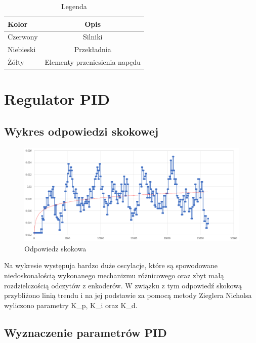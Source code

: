 \documentclass[10pt, a4paper]{article}
\begin{document}
	
		\begin{table}[H]
			\centering
			\begin{tabular}{|l|c|} \hline
				\textbf{Kolor} & \textbf{Opis} \\
				\hline  Czerwony & Silniki  \\\hline
				Niebieski & Przekładnia\\\hline
				Żółty &  Elementy przeniesienia napędu\\
				\hline
			\end{tabular}
			\caption{Legenda}
			\label{tab:Legenda}
		\end{table}

\section{Regulator PID}

\subsection{Wykres odpowiedzi skokowej}
\begin{figure}[H]
		\centering
		\includegraphics[width=1\textwidth]{figures/odp.png}
		\caption{Odpowiedz skokowa}
		\label{fig:Odpowiedz skokowa}
	\end{figure}
	
	Na wykresie występuja bardzo duże oscylacje, które są spowodowane niedoskonałością wykonanego mechanizmu różnicowego oraz zbyt małą rozdzielczością odczytów z enkoderów. W związku z tym odpowiedź skokową przybliżono linią trendu i na jej podstawie za pomocą metody Zieglera Nicholsa wyliczono parametry K_{p}, K_{i} \hspace{0.1cm} oraz \hspace{0.1cm} K_{d}.
	
\subsection{Wyznaczenie parametrów PID}
\end{document}
